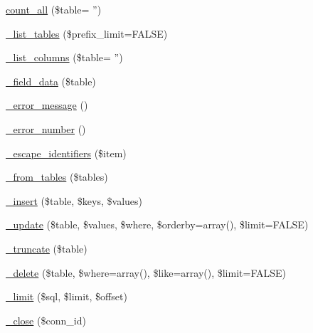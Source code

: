 \begin{DoxyCompactItemize}
\hyperlink{class_c_i___d_b__mssql__driver_a66111c61856499b091af32502978d4fc}{count\-\_\-all} (\$table= '')
\item 
\hyperlink{class_c_i___d_b__mssql__driver_a435c0f3ce54fe7daa178baa8532ebd54}{\-\_\-list\-\_\-tables} (\$prefix\-\_\-limit=F\-A\-L\-S\-E)
\item 
\hyperlink{class_c_i___d_b__mssql__driver_a2a81bb476a5c76fe6f763b0557c1e4c2}{\-\_\-list\-\_\-columns} (\$table= '')
\item 
\hyperlink{class_c_i___d_b__mssql__driver_a95247d9671893adc3444cb184ad32ea1}{\-\_\-field\-\_\-data} (\$table)
\item 
\hyperlink{class_c_i___d_b__mssql__driver_a4ca764fe1d6ad526f770f36b5f332bbb}{\-\_\-error\-\_\-message} ()
\item 
\hyperlink{class_c_i___d_b__mssql__driver_a3e48199b3a946499b7e5fba0cdfa6b86}{\-\_\-error\-\_\-number} ()
\item 
\hyperlink{class_c_i___d_b__mssql__driver_aeabfb3952399caa92a013621a98e3042}{\-\_\-escape\-\_\-identifiers} (\$item)
\item 
\hyperlink{class_c_i___d_b__mssql__driver_a885a8b4372b5c099749cefa73767a744}{\-\_\-from\-\_\-tables} (\$tables)
\item 
\hyperlink{class_c_i___d_b__mssql__driver_a69ee76b136052e0a8f06097fb388e53e}{\-\_\-insert} (\$table, \$keys, \$values)
\item 
\hyperlink{class_c_i___d_b__mssql__driver_ae869ae2275175c5ffa22816a02099d96}{\-\_\-update} (\$table, \$values, \$where, \$orderby=array(), \$limit=F\-A\-L\-S\-E)
\item 
\hyperlink{class_c_i___d_b__mssql__driver_aa029600528fc1ce660a23ff4b4667f95}{\-\_\-truncate} (\$table)
\item 
\hyperlink{class_c_i___d_b__mssql__driver_ace3cbc04a520b7811fc956cdb9ae1c19}{\-\_\-delete} (\$table, \$where=array(), \$like=array(), \$limit=F\-A\-L\-S\-E)
\item 
\hyperlink{class_c_i___d_b__mssql__driver_aeeaa5cd68dc6ace010c0b8aae89c2d15}{\-\_\-limit} (\$sql, \$limit, \$offset)
\item 
\hyperlink{class_c_i___d_b__mssql__driver_a557bd6ddde8de1f7814e10b1120efd29}{\-\_\-close} (\$conn\-\_\-id)
\end{DoxyCompactItemize}
